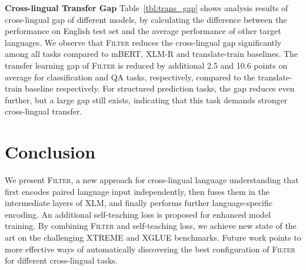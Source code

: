 \noindent\textbf{Cross-lingual Transfer Gap}
Table~\ref{tbl:trans_gap} shows analysis results of cross-lingual gap of different models, by calculating the difference between the performance on English test set and the average performance of other target languages.
We observe that \textsc{Filter} reduces the cross-lingual gap significantly among all tasks compared to mBERT, XLM-R and translate-train baselines.
The transfer learning gap of \textsc{Filter} is reduced by additional 2.5 and 10.6 points on average for classification and QA tasks, respectively, compared to the translate-train baseline respectively. 
For structured prediction tasks, the gap reduces even further, but a large gap still exists, indicating that this task demands stronger cross-lingual transfer. 


\section{Conclusion}
We present \textsc{Filter}, a new approach for cross-lingual language understanding that  
first encodes paired language input independently, then fuses them in the intermediate layers of XLM, and finally performs further language-specific encoding.
An additional self-teaching loss is proposed for enhanced model training. By combining \textsc{Filter} and self-teaching loss, we achieve new state of the art on the challenging XTREME and XGLUE benchmarks.
Future work points to more effective ways of automatically discovering the best configuration of \textsc{Filter} for different cross-lingual tasks.